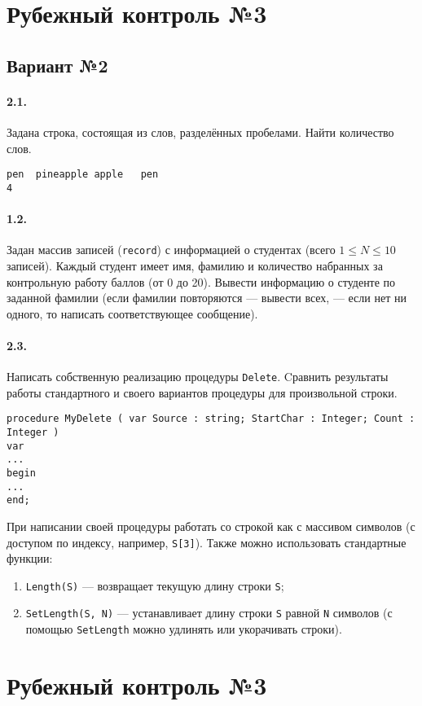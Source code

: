 \documentclass[12pt,a4paper]{report}
\begin{document}
\clearpage
\section*{Рубежный контроль №3}
\subsection*{Вариант №2}
\paragraph*{2.1.}
Задана строка, состоящая из слов, разделённых пробелами. Найти количество слов.
\begin{verbatim}
pen  pineapple apple   pen
4
\end{verbatim}
\paragraph*{1.2.}
Задан массив записей (\texttt{record}) с информацией о студентах (всего $ 1 \le N \le 10 $ записей). Каждый студент имеет имя, фамилию и количество набранных за контрольную работу баллов (от 0 до 20).
Вывести информацию о студенте по заданной фамилии (если фамилии повторяются --- вывести всех, --- если нет ни одного, то написать соответствующее сообщение).
\paragraph*{2.3.}
Написать собственную реализацию процедуры \texttt{Delete}. Cравнить результаты работы стандартного и своего вариантов процедуры для произвольной строки.
\begin{verbatim}
procedure MyDelete ( var Source : string; StartChar : Integer; Count : Integer ) 
var
...
begin
...
end;
\end{verbatim}
При написании своей процедуры работать со строкой как с массивом символов (с доступом по индексу, например, \texttt{S[3]}). Также можно использовать стандартные функции:
\begin{enumerate}
\item \texttt{Length(S)} --- возвращает текущую длину строки \texttt{S};
\item \texttt{SetLength(S, N)} --- устанавливает длину строки \texttt{S} равной \texttt{N} символов (с помощью \texttt{SetLength} можно удлинять или укорачивать строки).
\end{enumerate}


\clearpage
\section*{Рубежный контроль №3}
\end{document}
